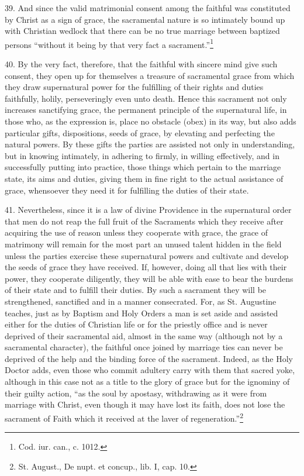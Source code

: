 \documentclass[12pt,a4paper]{book}
\begin{document}
39. And since the valid matrimonial consent among the faithful was constituted by Christ as a sign of grace, the sacramental nature is so intimately bound up with Christian wedlock that there can be no true marriage between baptized persons ``without it being by that very fact a sacrament.''\footnote{Cod. iur. can., c. 1012.}

40. By the very fact, therefore, that the faithful with sincere mind give such consent, they open up for themselves a treasure of sacramental grace from which they draw supernatural power for the fulfilling of their rights and duties faithfully, holily, perseveringly even unto death. Hence this sacrament not only increases sanctifying grace, the permanent principle of the supernatural life, in those who, as the expression is, place no obstacle (obex) in its way, but also adds particular gifts, dispositions, seeds of grace, by elevating and perfecting the natural powers. By these gifts the parties are assisted not only in understanding, but in knowing intimately, in adhering to firmly, in willing effectively, and in successfully putting into practice, those things which pertain to the marriage state, its aims and duties, giving them in fine right to the actual assistance of grace, whensoever they need it for fulfilling the duties of their state.

41. Nevertheless, since it is a law of divine Providence in the supernatural order that men do not reap the full fruit of the Sacraments which they receive after acquiring the use of reason unless they cooperate with grace, the grace of matrimony will remain for the most part an unused talent hidden in the field unless the parties exercise these supernatural powers and cultivate and develop the seeds of grace they have received. If, however, doing all that lies with their power, they cooperate diligently, they will be able with ease to bear the burdens of their state and to fulfill their duties. By such a sacrament they will be strengthened, sanctified and in a manner consecrated. For, as St. Augustine teaches, just as by Baptism and Holy Orders a man is set aside and assisted either for the duties of Christian life or for the priestly office and is never deprived of their sacramental aid, almost in the same way (although not by a sacramental character), the faithful once joined by marriage ties can never be deprived of the help and the binding force of the sacrament. Indeed, as the Holy Doctor adds, even those who commit adultery carry with them that sacred yoke, although in this case not as a title to the glory of grace but for the ignominy of their guilty action, ``as the soul by apostasy, withdrawing as it were from marriage with Christ, even though it may have lost its faith, does not lose the sacrament of Faith which it received at the laver of regeneration.''\footnote{St. August., De nupt. et concup., lib. I, cap. 10.}
\end{document}
